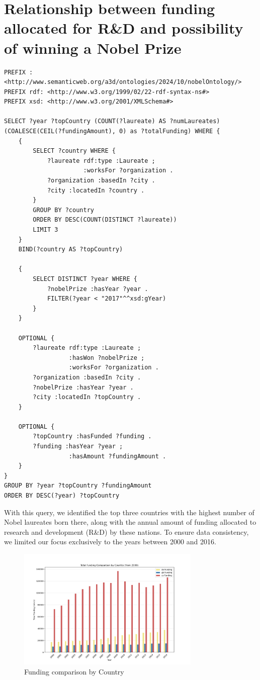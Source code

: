 \documentclass{article}
\begin{document}
\newpage

\section{Relationship between funding allocated for R\&D and possibility of winning a Nobel Prize}

\begin{lstlisting}
PREFIX : <http://www.semanticweb.org/a3d/ontologies/2024/10/nobelOntology/>
PREFIX rdf: <http://www.w3.org/1999/02/22-rdf-syntax-ns#>
PREFIX xsd: <http://www.w3.org/2001/XMLSchema#>

SELECT ?year ?topCountry (COUNT(?laureate) AS ?numLaureates) (COALESCE(CEIL(?fundingAmount), 0) as ?totalFunding) WHERE {
    {
        SELECT ?country WHERE {
            ?laureate rdf:type :Laureate ;
                      :worksFor ?organization .
            ?organization :basedIn ?city .
            ?city :locatedIn ?country .
        }
        GROUP BY ?country
        ORDER BY DESC(COUNT(DISTINCT ?laureate))
        LIMIT 3
    }
    BIND(?country AS ?topCountry)

    {
        SELECT DISTINCT ?year WHERE {
            ?nobelPrize :hasYear ?year .
            FILTER(?year < "2017"^^xsd:gYear)
        }
    }

    OPTIONAL {
        ?laureate rdf:type :Laureate ;
                  :hasWon ?nobelPrize ;
                  :worksFor ?organization .
        ?organization :basedIn ?city .
        ?nobelPrize :hasYear ?year .
        ?city :locatedIn ?topCountry .
    }

    OPTIONAL {
        ?topCountry :hasFunded ?funding .
        ?funding :hasYear ?year ;
                  :hasAmount ?fundingAmount .
    }
}
GROUP BY ?year ?topCountry ?fundingAmount
ORDER BY DESC(?year) ?topCountry
\end{lstlisting}

\vspace{1em}

With this query, we identified the top three countries with the highest number of Nobel laureates born there,
along with the annual amount of funding allocated to research and development (R\&D) by these nations.
To ensure data consistency, we limited our focus exclusively to the years between 2000 and 2016.

\begin{figure}[H]
	\centering
	\includegraphics[width=0.78\textwidth]{../queries/plots/funding_comparison_by_country.png}
	\caption{Funding comparison by Country}
	\label{fig:fundings_per_country}
\end{figure}
\end{document}
